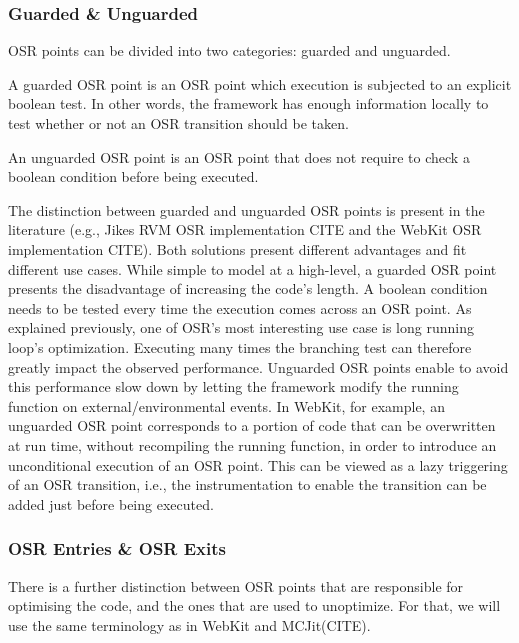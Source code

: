 \subsubsection{Guarded \& Unguarded}

OSR points can be divided into two categories: guarded and unguarded.
\begin{definition}
A guarded OSR point is an OSR point which execution is subjected to an explicit boolean test.
In other words, the framework has enough information locally to test whether or not an OSR transition should be taken.
\end{definition}
\begin{definition}
An unguarded OSR point is an OSR point that does not require to check a boolean condition before being executed. 
\end{definition}
The distinction between guarded and unguarded OSR points is present in the literature (e.g., Jikes RVM OSR implementation CITE and the WebKit OSR implementation CITE).
Both solutions present different advantages and fit different use cases. 
While simple to model at a high-level, a guarded OSR point presents the disadvantage of increasing the code's length. 
A boolean condition needs to be tested every time the execution comes across an OSR point.
As explained previously, one of OSR's most interesting use case is long running loop's optimization.
Executing many times the branching test can therefore greatly impact the observed performance.
Unguarded OSR points enable to avoid this performance slow down by letting the framework modify the running function on external/environmental events.
In WebKit, for example, an unguarded OSR point corresponds to a portion of code that can be overwritten at run time, without recompiling the running function, in order to introduce an unconditional execution of an OSR point.
This can be viewed as a lazy triggering of an OSR transition, i.e., the instrumentation to enable the transition can be added just before being executed.\\

\subsubsection{OSR Entries \& OSR Exits}

There is a further distinction between OSR points that are responsible for optimising the code, and the ones that are used to unoptimize.
For that, we will use the same terminology as in WebKit and MCJit(CITE).

